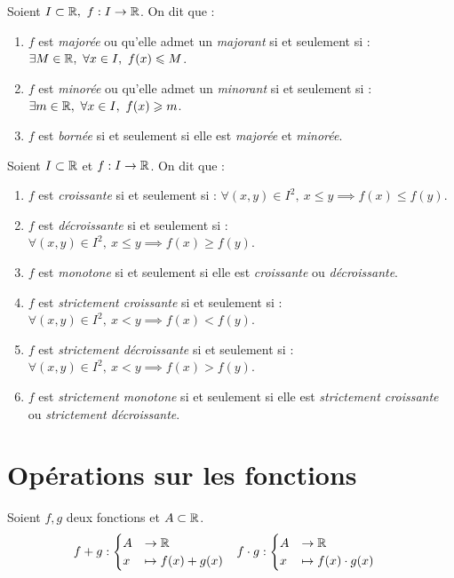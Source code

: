 \begin{definition}
	Soient $I \subset \mathbb{R},\ f : I \to \mathbb{R}$. On dit que :
	\begin{enumerate}
	    \item $f$ est \emph{majorée} ou qu'elle admet un \emph{majorant} si et seulement si : $\exists M \in \mathbb{R},\ \forall x \in I,\ f(x) \leqslant M$.
        \item $f$ est \emph{minorée} ou qu'elle admet un \emph{minorant} si et seulement si : $\exists m \in \mathbb{R},\ \forall x \in I,\ f(x) \geqslant m$.
        \item $f$ est \emph{bornée} si et seulement si elle est \emph{majorée} et \emph{minorée}.
	\end{enumerate}
\end{definition}

\begin{definition}
	Soient $I \subset \mathbb{R}$ et $f : I \to \mathbb{R}$. On dit que :
    \begin{enumerate}
        \item $f$ est \emph{croissante} si et seulement si : $\forall (x, y) \in I^2,\ x \leq y \implies f(x) \leq f(y)$.
        \item $f$ est \emph{décroissante} si et seulement si : $\forall (x, y) \in I^2,\ x \leq y \implies f(x) \geq f(y)$.
        \item $f$ est \emph{monotone} si et seulement si elle est \emph{croissante} ou \emph{décroissante}.
        \item $f$ est \emph{strictement croissante} si et seulement si : $\forall (x, y) \in I^2,\ x < y \implies f(x) < f(y)$.
        \item $f$ est \emph{strictement décroissante} si et seulement si : $\forall (x, y) \in I^2,\ x < y \implies f(x) > f(y)$.
        \item $f$ est \emph{strictement monotone} si et seulement si elle est \emph{strictement croissante} ou \emph{strictement décroissante}.
    \end{enumerate}
\end{definition}

\section{Opérations sur les fonctions}
\begin{definition}
	Soient $f, g$ deux fonctions et $A \subset \mathbb{R}$.
	\begin{align*}
		&f + g : 
        \begin{cases}
            A &\to \mathbb{R} \\
		        x &\mapsto f(x) + g(x)
        \end{cases}
        &
        &f \cdot g : 
        \begin{cases}
            A &\to \mathbb{R} \\
		            x &\mapsto f(x) \cdot g(x)
        \end{cases}
	\end{align*}
\end{definition}

